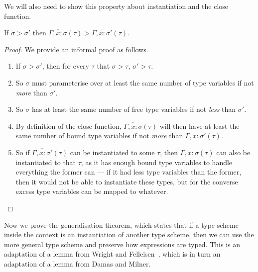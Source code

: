 We will also need to show this property about instantiation and the
close function.
\begin{lemma}\label{lem:close>}
  If $\sigma > \sigma'$ then $\overline{\Gamma , x : \sigma}(\tau) > \overline{\Gamma, x : \sigma'}(\tau)$.
\end{lemma}
\begin{proof}
  We provide an informal proof as follows.
  \begin{enumerate}
  \item If $\sigma > \sigma'$, then for every $\tau$ that $\sigma > \tau$, $\sigma' > \tau$.
  \item So $\sigma$ must parameterise over at least the same number of type
    variables if not \textit{more} than $\sigma'$.
  \item So $\sigma$ has at least the same number of free type variables if
    not \textit{less} than $\sigma'$.
  \item By definition of the close function,
    $\overline{\Gamma, x : \sigma}(\tau)$ will then have at least the same number
    of bound type variables if not \textit{more} than
    $\overline{\Gamma, x : \sigma'}(\tau)$.
  \item So if $\overline{\Gamma, x : \sigma'}(\tau)$ can be instantiated to some
    $\tau$, then $\overline{\Gamma, x : \sigma}(\tau)$ can also be instantiated to
    that $\tau$, as it has enough bound type variables to handle
    everything the former can --- if it had less type variables than the
    former, then it would not be able to instantiate these types, but
    for the converse excess type variables can be mapped to whatever.
  \end{enumerate}
\end{proof}

Now we prove the generalisation theorem, which states that if a type
scheme inside the context is an instantiation of another type scheme,
then we can use the more general type scheme and preserve how
expressions are typed. This is an adaptation of a lemma from Wright
and Felleisen~\cite[Lemma 4.6]{wright1994}, which is in turn an
adaptation of a lemma from Damas and Milner.


